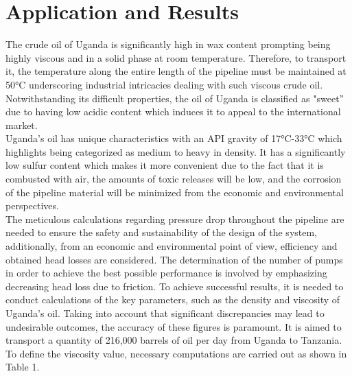 \documentclass[12pt]{article}
\begin{document}
\section*{Application and Results}
{\fontsize{12}{12}\selectfont 
The crude oil of Uganda is significantly high in wax content prompting being highly viscous and in a solid phase at room temperature. Therefore, to transport it, the temperature along the entire length of the pipeline must be maintained at 50°C underscoring industrial intricacies dealing with such viscous crude oil. Notwithstanding its difficult properties, the oil of Uganda is classified as "sweet” due to having low acidic content which induces it to appeal to the international market. 
\\

Uganda's oil has unique characteristics with an API gravity of 17°C-33°C which highlights being categorized as medium to heavy in density. It has a significantly low sulfur content which makes it more convenient due to the fact that it is combusted with air, the amounts of toxic releases will be low, and the corrosion of the pipeline material will be minimized from the economic and environmental perspectives.
\\

The meticulous calculations regarding pressure drop throughout the pipeline are needed to ensure the safety and sustainability of the design of the system, additionally, from an economic and environmental point of view, efficiency and obtained head losses are considered. The determination of the number of pumps in order to achieve the best possible performance is involved by emphasizing decreasing head loss due to friction. To achieve successful results, it is needed to conduct calculations of the key parameters, such as the density and viscosity of Uganda's oil. Taking into account that significant discrepancies may lead to undesirable outcomes, the accuracy of these figures is paramount. It is aimed to transport a quantity of 216,000 barrels of oil per day from Uganda to Tanzania.
\\

To define the viscosity value, necessary computations are carried out as shown in Table 1.

}
\end{document}
